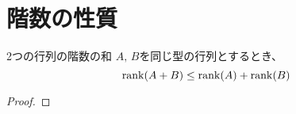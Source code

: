 \documentclass[../../../topic_linear-algebra]{subfiles}
\begin{document}
\sectionline
\section{階数の性質}

\begin{theorem}{2つの行列の階数の和}
  $A,\,B$を同じ型の行列とするとき、
  \begin{equation*}
    \rank(A+B) \leq \rank(A) + \rank(B)
  \end{equation*}
\end{theorem}

\begin{proof}
\end{proof}
\end{document}
